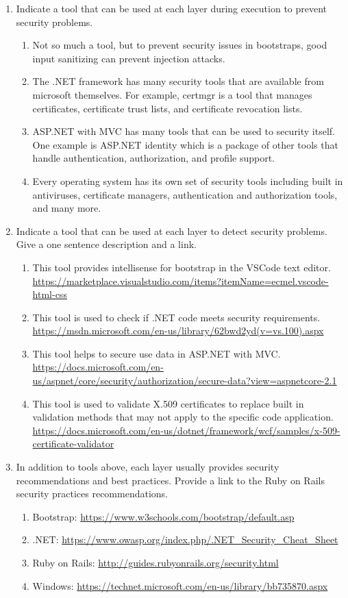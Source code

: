 \documentclass[12pt]{article}
\theoremstyle{plain}
\theoremstyle{definition}
\theoremstyle{plain}
\begin{document}
\begin{enumerate}
\item Indicate a tool that can be used at each layer during execution to prevent security problems.
	\begin{enumerate}
	\item Not so much a tool, but to prevent security issues in bootstraps, good input sanitizing can prevent injection attacks.
	\item The .NET framework has many security tools that are available from microsoft themselves. For example, certmgr is a tool that manages certificates, certificate trust lists, and certificate revocation lists.
	\item ASP.NET with MVC has many tools that can be used to security itself. One example is ASP.NET identity which is a package of other tools that handle authentication, authorization, and profile support.
	\item Every operating system has its own set of security tools including built in antiviruses, certificate managers, authentication and authorization tools, and many more.
	\end{enumerate}
	
\item Indicate a tool that can be used at each layer to detect security problems. Give a one sentence description and a link.
	\begin{enumerate}
	\item This tool provides intellisense for bootstrap in the VSCode text editor. \url{https://marketplace.visualstudio.com/items?itemName=ecmel.vscode-html-css}
	\item This tool is used to check if .NET code meets security requirements. \url{https://msdn.microsoft.com/en-us/library/62bwd2yd(v=vs.100).aspx}
	\item This tool helps to secure use data in ASP.NET with MVC. \url{https://docs.microsoft.com/en-us/aspnet/core/security/authorization/secure-data?view=aspnetcore-2.1}
	\item This tool is used to validate X.509 certificates to replace built in validation methods that may not apply to the specific code application. \url{https://docs.microsoft.com/en-us/dotnet/framework/wcf/samples/x-509-certificate-validator}
	\end{enumerate}

\item In addition to tools above, each layer usually provides security recommendations and best practices. Provide a link to the Ruby on Rails security practices recommendations.
	\begin{enumerate}
	\item Bootstrap: \url{https://www.w3schools.com/bootstrap/default.asp}
	\item .NET: \url{https://www.owasp.org/index.php/.NET_Security_Cheat_Sheet}
	\item Ruby on Rails: \url{http://guides.rubyonrails.org/security.html}
	\item Windows: \url{https://technet.microsoft.com/en-us/library/bb735870.aspx}
	\end{enumerate}
	

\end{enumerate}
\end{document}

